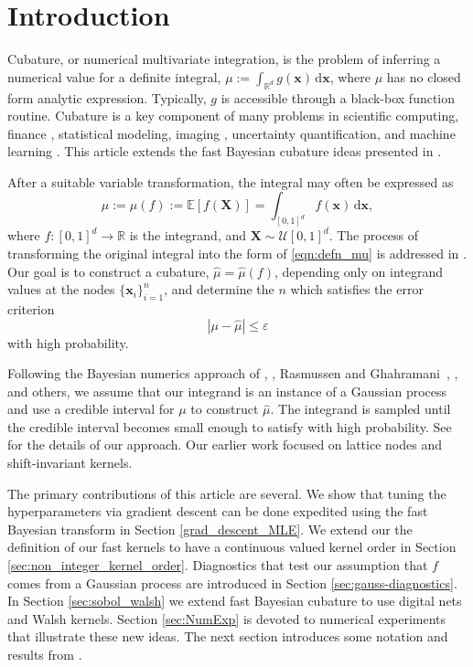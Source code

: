 \documentclass{svjour3}                     %
\newcommand{\bm}[1]{\boldsymbol{#1}}
\newcommand{\dif}[1]{\text{d}{#1}}
\newcommand{\reals}{\mathbb{R}}
\newcommand{\Ex}{\mathbb{E}}
\newcommand{\vx}{\bm{x}}
\newcommand{\dvx}{\dif{\bm{x}}}
\newcommand{\hmu}{\widehat{\mu}}
\newcommand{\errtol}{\varepsilon}
\def\abs#1{\ensuremath{\left \lvert #1 \right \rvert}}
\newcommand{\JRNote}[1]{{\textcolor{green}{JR: #1}}}
\begin{document}
\section{Introduction}
\label{intro}

Cubature, or numerical multivariate integration, is the problem of inferring a numerical value for a definite integral, 
$ \mu := \int_{\reals^d} g(\vx) \, \dif \vx$, where $\mu$ has no closed form analytic expression. Typically, $g$ is accessible through a black-box function routine. 
Cubature is a key component of many problems in scientific computing, finance \cite{Gla03}, statistical modeling, imaging \cite{Keller2013}, uncertainty quantification, and machine learning \cite{Goodfellow-et-al-2016}. This article extends the fast Bayesian cubature ideas presented in \cite{RatHic19a}.

After a suitable variable transformation, the integral may often be expressed as
\begin{equation}
\label{eqn:defn_mu}
\mu:= \mu(f) := \Ex[f(\boldsymbol{X})] = \int_{[0,1]^d} f(\vx)\, \dvx, 
\end{equation}
where $f:[0,1]^d \to \reals$ is the integrand, and $\boldsymbol{X} \sim \mathcal{U}[0,1]^d$.  The process of transforming the original integral into the form of \eqref{eqn:defn_mu} is addressed in \cite{BecHae92b, Sid08a, Sid93, Lau96a, CriEtal07}.  Our goal is to construct a cubature, $\hmu = \hmu(f)$, depending only on integrand values at the nodes $\{\vx_i\}_{i=1}^n$, and determine the $n$ which satisfies the error criterion
\begin{equation}
\label{eqn:err_crit} 
\abs{\mu - \hmu} \leq \errtol
\end{equation}
with high probability.

Following the Bayesian numerics approach of \cite{Dia88a}, \cite{OHa91a}, Rasmussen and Ghahramani~\cite{RasGha03a}, \cite{BriEtal18a}, and others, we assume that our integrand is an instance of a Gaussian process and use a credible interval for $\mu$ to construct $\hmu$.  The integrand is sampled until the credible interval becomes small enough to satisfy \label{eqn:err_crit}  with high probability.  See \cite{RatHic19a} for the details of our approach.  Our earlier work focused on lattice nodes and shift-invariant kernels.

The primary contributions of this article are several. We show that tuning the hyperparameters via gradient descent can be done expedited using the fast Bayesian transform in Section \ref{grad_descent_MLE}.  We extend our the definition of our fast kernels to have a continuous valued kernel order in Section \ref{sec:non_integer_kernel_order}. Diagnostics that test our assumption that $f$ comes from a Gaussian process are introduced in Section \ref{sec:gauss-diagnostics}. In Section \ref{sec:sobol_walsh} we extend fast Bayesian cubature to use digital nets and Walsh kernels.  Section \ref{sec:NumExp} is devoted to numerical experiments that illustrate these new ideas.  The next section introduces some notation and results from \cite{RatHic19a}.
\end{document}
